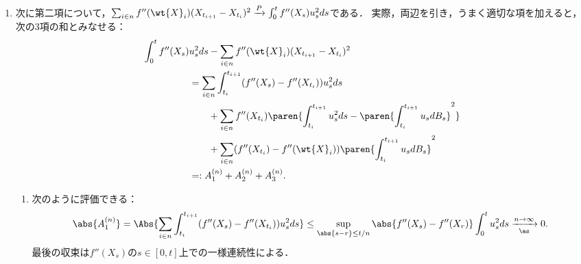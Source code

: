 \documentclass[uplatex,dvipdfmx]{jsreport}
\begin{document}
\begin{Proof}
\begin{enumerate}
\begin{description}
\begin{enumerate}
                実際，確率積分は線型であることと，$f'(X_{t_i})$は確率積分の内外に自由に移動できること\ref{prop-algebraic-property-of-indefinite-integral-process}に注意すれば，
                \begin{align*}
                    \Norm{\sum_{i\in n}\paren{f'(X_{t_i})\int^{t_{i+1}}_{t_i}u_sdB_s-\int^{t_{i+1}}_{t_i}f'(X_s)u_sdB_S}}^2_2&=\Norm{\sum_{i\in n}\int^{t_{i+1}}_{t_i}(f'(X_{t_i})-f'(X_s))u_sdB_s}^2_2\\
                    &\le 2\sum_{i\in n}\Norm{\int^{t_{i+1}}_{t_i}(f'(X_{t_i})-f'(X_s))u_sdB_s}^2_2\\
                    &=2\sum_{i\in n}E\Square{\int^{t_{i+1}}_{t_i}(f'(X_{t_i})-f'(X_s))^2u_s^2ds}\\
                    &\le2\sum_{i\in n}E\Square{\sup_{\abs{s-u}\le t/n}(f'(X_s)-f'(X_u))^2\int^{t_{i+1}}_{t_i}u_s^2ds}\xrightarrow{n\to\infty}0.
                \end{align*}
                最後の収束は，$f'(X_s)$の$s\in[0,t]$上の一様連続性と，$\int^{t_{i+1}}_{t_i}u_s^2ds\le N<\infty$の仮定による．
                \item 次に第二項について，$\sum_{i\in n}f''(\wt{X}_i)(X_{t_{i+1}}-X_{t_i})^2\xrightarrow{P}\int^t_0f''(X_s)u^2_sds$である．
                実際，両辺を引き，うまく適切な項を加えると，次の3項の和とみなせる：
                \begin{align*}
                    \int^t_0f''(X_s)&u^2_sds-\sum_{i\in n}f''(\wt{X}_i)(X_{t_{i+1}}-X_{t_i})^2\\
                    &=\sum_{i\in n}\int^{t_{i+1}}_{t_i}(f''(X_s)-f''(X_{t_i}))u^2_sds\\
                    &\qquad+\sum_{i\in n}f''(X_{t_i})\paren{\int^{t_{i+1}}_{t_i}u^2_sds-\paren{\int^{t_{i+1}}_{t_i}u_sdB_s}^2}\\
                    &\qquad+\sum_{i\in n}(f''(X_{t_i})-f''(\wt{X}_i))\paren{\int^{t_{i+1}}_{t_i}u_sdB_s}^2\\
                    &=:A_1^{(n)}+A_2^{(n)}+A_3^{(n)}.
                \end{align*}
                \begin{enumerate}[({第}1{項})]
                    \item 次のように評価できる：
                    \[\abs{A_1^{(n)}}=\Abs{\sum_{i\in n}\int^{t_{i+1}}_{t_i}(f''(X_s)-f''(X_{t_i}))u_s^2ds}\le\sup_{\abs{s-r}\le t/n}\abs{f''(X_s)-f''(X_r)}\int^t_0u_s^2ds\xrightarrow[\as]{n\to\infty}0.\]
                    最後の収束は$f''(X_s)$の$s\in[0,t]$上での一様連続性による．

\end{enumerate}
\end{enumerate}
\end{description}
\end{enumerate}
\end{Proof}
\end{document}
